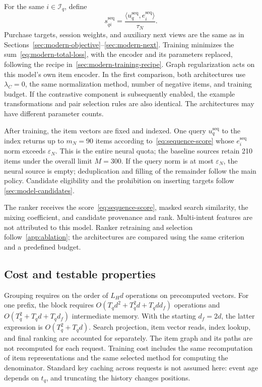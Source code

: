 \documentclass[12pt,a4paper]{article}
\newcommand{\eps}{\varepsilon}
\theoremstyle{plainru}
\begin{document}
For the same $i\in\mathcal I_q$, define
\begin{equation}\label{eq:sequence-score}
s_{qi}^{\mathrm{seq}}
=\frac{\langle u_q^{\mathrm{seq}},e_i^{\mathrm{seq}}\rangle}{\tau_N}.
\end{equation}
Purchase targets, session weights, and auxiliary next views
are the same as in Sections~\ref{sec:modern-objective}--\ref{sec:modern-next}.
Training minimizes the sum~\eqref{eq:modern-total-loss},
with the encoder and its parameters replaced, following
the recipe in~\ref{sec:modern-training-recipe}.
Graph regularization acts on this model's own item encoder.
In the first comparison, both architectures use $\lambda_C=0$,
the same normalization method, number of negative items, and training
budget. If the contrastive component is subsequently enabled, the example
transformations and pair selection rules are also identical. The architectures
may have different parameter counts.

After training, the item vectors are fixed and indexed.
One query $u_q^{\mathrm{seq}}$ to the index returns up to $m_N=90$
items according to~\eqref{eq:sequence-score}
whose $e_i^{\mathrm{seq}}$ norm exceeds $\eps_N$.
This is the entire neural quota; the baseline sources retain 210 items
under the overall limit $M=300$.
If the query norm is at most $\eps_N$, the neural source is empty;
deduplication and filling of the remainder follow the main policy.
Candidate eligibility and the prohibition on inserting targets follow
\ref{sec:model-candidates}.

The ranker receives the score~\eqref{eq:sequence-score}, masked search
similarity, the mixing coefficient, and candidate provenance and rank.
Multi-intent features are not attributed to this model.
Ranker retraining and selection follow~\ref{app:ablation};
the architectures are compared using the same criterion and a predefined budget.

\subsection{Cost and testable properties}
\label{sec:sequence-cost}

Grouping requires on the order of $L_Hd$ operations on precomputed vectors.
For one prefix, the block requires
$O(T_qd^2+T_q^2d+T_qdd_f)$ operations
and $O(T_q^2+T_qd+T_qd_f)$ intermediate memory.
With the starting $d_f=2d$, the latter expression is $O(T_q^2+T_qd)$.
Search projection, item vector reads,
index lookup, and final ranking are accounted for separately.
The item graph and its paths are not recomputed for each request.
Training cost includes the same recomputation of item representations
and the same selected method for computing the denominator.
Standard key caching across requests is not assumed here:
event age depends on $t_q$, and truncating the history changes positions.
\end{document}
